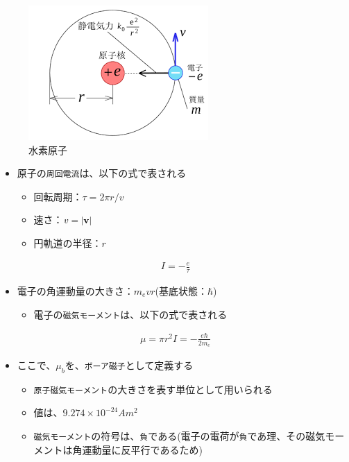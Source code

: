 \documentclass[11pt]{article}
\makeatletter
\def\maxwidth{\ifdim\Gin@nat@width>\linewidth\linewidth
    \else\Gin@nat@width\fi}
\let\Oldincludegraphics\includegraphics
\renewcommand{\includegraphics}[1]{\Oldincludegraphics[width=.8\maxwidth]{#1}}
\providecommand{\tightlist}{%
      \setlength{\itemsep}{0pt}\setlength{\parskip}{0pt}}
\makeatother
\begin{document}
\begin{figure}
\centering
\includegraphics{./images/水素原子.png}
\caption{水素原子}
\end{figure}

\begin{itemize}
\item
  原子の\texttt{周回電流}は、以下の式で表される

  \begin{itemize}
  \item
    回転周期：\(\tau = 2\pi r/ v\)
  \item
    速さ：\(v = |{\bf v}|\)
  \item
    円軌道の半径：\(r\)
  \end{itemize}
\end{itemize}

\begin{eqnarray}
I = - \frac{e}{\tau}
\end{eqnarray}

    \begin{itemize}
\item
  電子の角運動量の大きさ：\(m_e v r\)(基底状態：\(\hbar\))

  \begin{itemize}
  \tightlist
  \item
    電子の\texttt{磁気モーメント}は、以下の式で表される
  \end{itemize}
\end{itemize}

\begin{eqnarray}
\mu = \pi r^2 I = - \frac{e \hbar}{2 m_e}
\end{eqnarray}

    \begin{itemize}
\item
  ここで、\(\mu_b\)を、\texttt{ボーア磁子}として定義する

  \begin{itemize}
  \item
    \texttt{原子磁気モーメント}の大きさを表す単位として用いられる
  \item
    値は、\(9.274 \times 10^{-24} A m^2\)
  \item
    \texttt{磁気モーメント}の符号は、\texttt{負}である(電子の電荷が\texttt{負}であ理、その磁気モーメントは角運動量に反平行であるため)
  \end{itemize}
\end{itemize}
\end{document}
